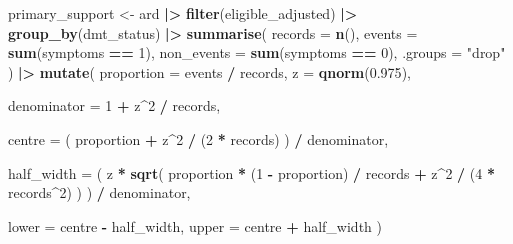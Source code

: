 \documentclass[
  british,
]{article}
\newenvironment{Shaded}{\begin{snugshade}}{\end{snugshade}}
\newcommand{\AttributeTok}[1]{\textcolor[rgb]{0.13,0.29,0.53}{#1}}
\newcommand{\DecValTok}[1]{\textcolor[rgb]{0.00,0.00,0.81}{#1}}
\newcommand{\FloatTok}[1]{\textcolor[rgb]{0.00,0.00,0.81}{#1}}
\newcommand{\FunctionTok}[1]{\textcolor[rgb]{0.13,0.29,0.53}{\textbf{#1}}}
\newcommand{\NormalTok}[1]{#1}
\newcommand{\OtherTok}[1]{\textcolor[rgb]{0.56,0.35,0.01}{#1}}
\newcommand{\SpecialCharTok}[1]{\textcolor[rgb]{0.81,0.36,0.00}{\textbf{#1}}}
\newcommand{\StringTok}[1]{\textcolor[rgb]{0.31,0.60,0.02}{#1}}
\begin{document}
\begin{Shaded}
\begin{Highlighting}[]
\NormalTok{primary\_support }\OtherTok{\textless{}{-}}\NormalTok{ ard }\SpecialCharTok{|\textgreater{}}
  \FunctionTok{filter}\NormalTok{(eligible\_adjusted) }\SpecialCharTok{|\textgreater{}}
  \FunctionTok{group\_by}\NormalTok{(dmt\_status) }\SpecialCharTok{|\textgreater{}}
  \FunctionTok{summarise}\NormalTok{(}
    \AttributeTok{records =} \FunctionTok{n}\NormalTok{(),}
    \AttributeTok{events =} \FunctionTok{sum}\NormalTok{(symptoms }\SpecialCharTok{==} \DecValTok{1}\NormalTok{),}
    \AttributeTok{non\_events =} \FunctionTok{sum}\NormalTok{(symptoms }\SpecialCharTok{==} \DecValTok{0}\NormalTok{),}
    \AttributeTok{.groups =} \StringTok{"drop"}
\NormalTok{  ) }\SpecialCharTok{|\textgreater{}}
  \FunctionTok{mutate}\NormalTok{(}
    \AttributeTok{proportion =}\NormalTok{ events }\SpecialCharTok{/}\NormalTok{ records,}
    \AttributeTok{z =} \FunctionTok{qnorm}\NormalTok{(}\FloatTok{0.975}\NormalTok{),}

    \AttributeTok{denominator =} \DecValTok{1} \SpecialCharTok{+}\NormalTok{ z}\SpecialCharTok{\^{}}\DecValTok{2} \SpecialCharTok{/}\NormalTok{ records,}

    \AttributeTok{centre =}\NormalTok{ (}
\NormalTok{      proportion }\SpecialCharTok{+}\NormalTok{ z}\SpecialCharTok{\^{}}\DecValTok{2} \SpecialCharTok{/}\NormalTok{ (}\DecValTok{2} \SpecialCharTok{*}\NormalTok{ records)}
\NormalTok{    ) }\SpecialCharTok{/}\NormalTok{ denominator,}

    \AttributeTok{half\_width =}\NormalTok{ (}
\NormalTok{      z }\SpecialCharTok{*} \FunctionTok{sqrt}\NormalTok{(}
\NormalTok{        proportion }\SpecialCharTok{*}\NormalTok{ (}\DecValTok{1} \SpecialCharTok{{-}}\NormalTok{ proportion) }\SpecialCharTok{/}\NormalTok{ records }\SpecialCharTok{+}
\NormalTok{          z}\SpecialCharTok{\^{}}\DecValTok{2} \SpecialCharTok{/}\NormalTok{ (}\DecValTok{4} \SpecialCharTok{*}\NormalTok{ records}\SpecialCharTok{\^{}}\DecValTok{2}\NormalTok{)}
\NormalTok{      )}
\NormalTok{    ) }\SpecialCharTok{/}\NormalTok{ denominator,}

    \AttributeTok{lower =}\NormalTok{ centre }\SpecialCharTok{{-}}\NormalTok{ half\_width,}
    \AttributeTok{upper =}\NormalTok{ centre }\SpecialCharTok{+}\NormalTok{ half\_width}
\NormalTok{  )}


\end{Highlighting}
\end{Shaded}
\end{document}
